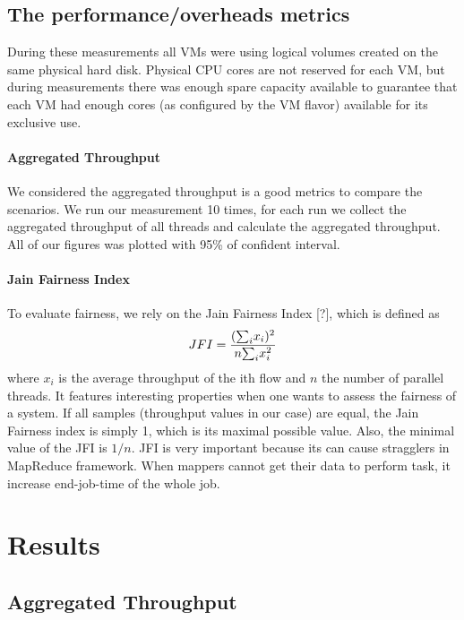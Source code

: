 \documentclass{acmsig}
\begin{document}
\subsection{The performance/overheads metrics}

During these measurements all VMs were using logical volumes created on the same physical hard disk. Physical CPU cores are not reserved for each VM, but during measurements there was enough spare capacity available to guarantee that each VM had enough cores (as configured by the VM flavor) available for its exclusive use.

\paragraph{Aggregated Throughput}
We considered the aggregated throughput is a good metrics to compare the scenarios. We run our measurement 10 times, for each run we collect the aggregated throughput of all threads and calculate the aggregated throughput. All of our figures was plotted with 95\% of confident interval.

\paragraph{Jain Fairness Index}
  To evaluate fairness, we rely on the Jain Fairness Index [?], which is defined as
  $$JFI={({\sum}_{i}x_{i})^{2}\over n{\sum}_{i}x_{i}^{2}}$$
  where $x_{i}$ is the average throughput of the ith flow and $n$ the number of parallel threads. It features interesting properties when one wants to assess the fairness of a system. If all samples (throughput values in our case) are equal, the Jain Fairness index is simply 1, which is its maximal possible value. Also, the minimal value of the JFI is $1/n$. JFI is very important because its can cause stragglers in MapReduce framework. When mappers cannot get their data to perform task, it increase end-job-time of the whole job.

\section{Results}

\subsection{Aggregated Throughput}
\end{document}
